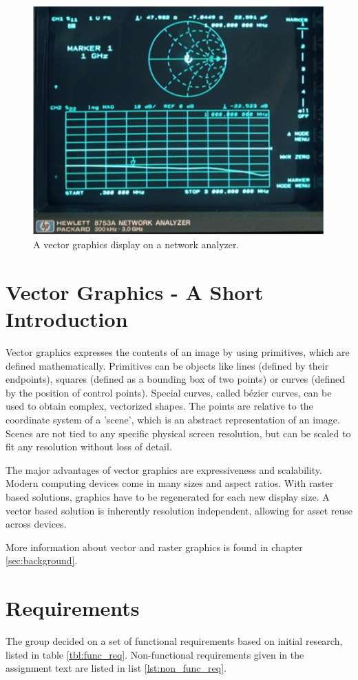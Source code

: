 \begin{figure}[h!]
    \centering
    \includegraphics[width=0.6\linewidth]{images/network-analyzer-vector-graphics-display.png}
    \caption{A vector graphics display on a network analyzer\cite{assignment-text}.}
    \label{fig:vector-display-network-analyzer}
\end{figure}

\section{Vector Graphics - A Short Introduction}
Vector graphics expresses the contents of an image by using primitives, which are defined mathematically.
Primitives can be objects like lines (defined by their endpoints), squares (defined as a bounding box of two points) or curves (defined by the position of control points). 
Special curves, called bézier curves, can be used to obtain complex, vectorized shapes.
The points are relative to the coordinate system of a 'scene', which is an abstract representation of an image.
Scenes are not tied to any specific physical screen resolution, but can be scaled to fit any resolution without loss of detail.

The major advantages of vector graphics are expressiveness and scalability.
Modern computing devices come in many sizes and aspect ratios.
With raster based solutions, graphics have to be regenerated for each new display size.
A vector based solution is inherently resolution independent, allowing for asset reuse across devices.

More information about vector and raster graphics is found in chapter \ref{sec:background}.

\section{Requirements}
\label{sec:requirements}
The group decided on a set of functional requirements based on initial research, listed in table \ref{tbl:func_req}.
Non-functional requirements given in the assignment text are listed in list \ref{lst:non_func_req}.


